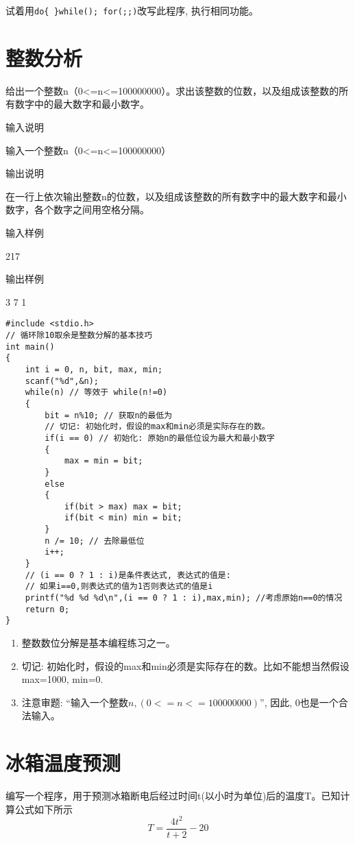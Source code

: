 \begin{note}
	试着用\lstinline|do{ }while(); for(;;)|改写此程序, 执行相同功能。
\end{note}

\section{整数分析}\label{integer}
给出一个整数n（0<=n<=100000000）。求出该整数的位数，以及组成该整数的所有数字中的最大数字和最小数字。

输入说明
	
输入一个整数n（0<=n<=100000000）

输出说明
	
在一行上依次输出整数n的位数，以及组成该整数的所有数字中的最大数字和最小数字，各个数字之间用空格分隔。

输入样例
	
217

输出样例
	
3 7 1

\begin{lstlisting}
#include <stdio.h>
// 循环除10取余是整数分解的基本技巧
int main()
{
	int i = 0, n, bit, max, min;
	scanf("%d",&n);
	while(n) // 等效于 while(n!=0)
	{
		bit = n%10; // 获取n的最低为
		// 切记: 初始化时，假设的max和min必须是实际存在的数。
		if(i == 0) // 初始化: 原始n的最低位设为最大和最小数字
		{
			max = min = bit;
		}  
		else
		{
			if(bit > max) max = bit;
			if(bit < min) min = bit;
		}
		n /= 10; // 去除最低位
		i++;
	} 
	// (i == 0 ? 1 : i)是条件表达式, 表达式的值是:
	// 如果i==0,则表达式的值为1否则表达式的值是i
	printf("%d %d %d\n",(i == 0 ? 1 : i),max,min); //考虑原始n==0的情况 
	return 0;
} 
\end{lstlisting}

\begin{note}[知识点]
  \begin{enumerate}
  	\item 整数数位分解是基本编程练习之一。
  	\item 切记: 初始化时，假设的max和min必须是实际存在的数。比如不能想当然假设max=1000, min=0.
  	\item 注意审题: ``输入一个整数$n,(0<=n<=100000000)$'', 因此, 0也是一个合法输入。
  \end{enumerate}
  
\end{note}

\section{冰箱温度预测}
编写一个程序，用于预测冰箱断电后经过时间t(以小时为单位)后的温度T。已知计算公式如下所示
\[ T=\frac{4t^2}{t+2}-20 \]

